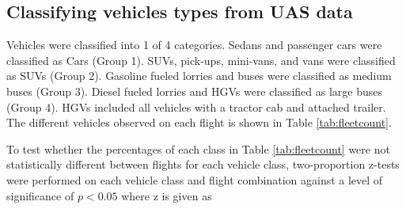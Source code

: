 \subsection{Classifying vehicles types from UAS data}
Vehicles were classified into 1 of 4 categories. Sedans and passenger cars were classified as Cars (Group 1). SUVs,  pick-ups, mini-vans, and vans were classified as SUVs (Group 2). Gasoline fueled lorries and buses were classified as medium buses (Group 3). Diesel fueled lorries and HGVs were classified as large buses (Group 4). HGVs included all vehicles with a tractor cab and attached trailer. The different vehicles observed on each flight is shown in Table \ref{tab:fleetcount}.

\begin{table}[H]
\centering
\caption{Fleet composition from each flight.}
\label{tab:fleetcount}
\end{table}

To test whether the percentages of each class in Table \ref{tab:fleetcount} were not statistically different between flights for each vehicle class, two-proportion z-tests were performed on each vehicle class and flight combination against a level of significance of $p < 0.05$ where z is given as

